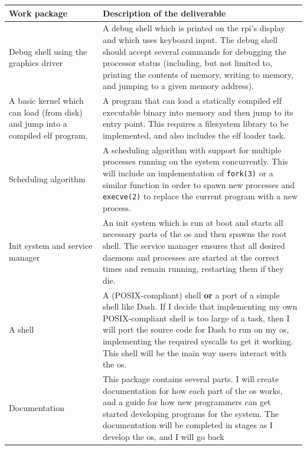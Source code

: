 \documentclass{article}
\begin{document}
\begin{table}[H]
\begin{center}
\begin{tabular}{|p{40mm}|p{115mm}|}
    \hline
    \textbf{Work package} & \textbf{Description of the deliverable} \\
    \hline
    Debug shell using the graphics driver &
    A debug shell which is printed on the \gls{rpi}'s display and which uses
    keyboard input. The debug shell should accept several commands for
    debugging the processor status (including, but not limited to, printing the
    contents of memory, writing to memory, and jumping to a given memory
    address).
    \\ \hline
    A basic kernel which can load (from disk) and jump into a compiled \gls{elf}
    program. &
    A program that can load a statically compiled \gls{elf} executable binary
    into memory and then jump to its entry point. This requires a filesystem
    library to be implemented, and also includes the \gls{elf} loader task.
    \\ \hline
    Scheduling algorithm &
    A scheduling algorithm with support for multiple processes running on the
    system concurrently. This will include an implementation of
    \texttt{fork(3)} or a similar function in order to spawn new processes and
    \texttt{execve(2)} to replace the current program with a new process.
    \\ \hline
    Init system and service manager &
    An init system which is run at boot and starts all necessary parts of the
    \gls{os} and then spawns the root shell. The service manager ensures that
    all desired daemons and processes are started at the correct times and
    remain running, restarting them if they die.
    \\ \hline
    A shell &
    A (POSIX-compliant) shell \textbf{or} a port of a simple shell like
    Dash\cite{dash-shell}. If I decide that implementing my own POSIX-compliant
    shell is too large of a task, then I will port the source code for Dash to
    run on my \gls{os}, implementing the required syscalls to get it working.
    This shell will be the main way users interact with the \gls{os}.
    \\ \hline
    Documentation &
    This package contains several parts. I will create documentation for how
    each part of the \gls{os} works, and a guide for how new programmers can get
    started developing programs for the system. The documentation will be
    completed in stages as I develop the \gls{os}, and I will go back

\end{tabular}
\end{center}
\end{table}
\end{document}
